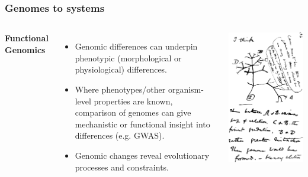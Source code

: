 %
\begin{frame}
  \frametitle{Genomes to systems}
    \begin{columns}[c] 
        \textcolor{RawSienna}{\textbf{Functional Genomics}}
        \begin{itemize}
         \item \textcolor{hutton_green}{Genomic differences can underpin phenotypic (morphological or physiological) differences.}
         \item Where phenotypes/other organism-level properties are known, comparison of genomes can give mechanistic or functional insight into differences (e.g. GWAS).
         \item \textcolor{hutton_blue}{Genomic changes reveal evolutionary processes and constraints.}
        \end{itemize}
        \includegraphics[width=\textwidth]{images/darwin_tree}
    \end{columns}  
\end{frame}



